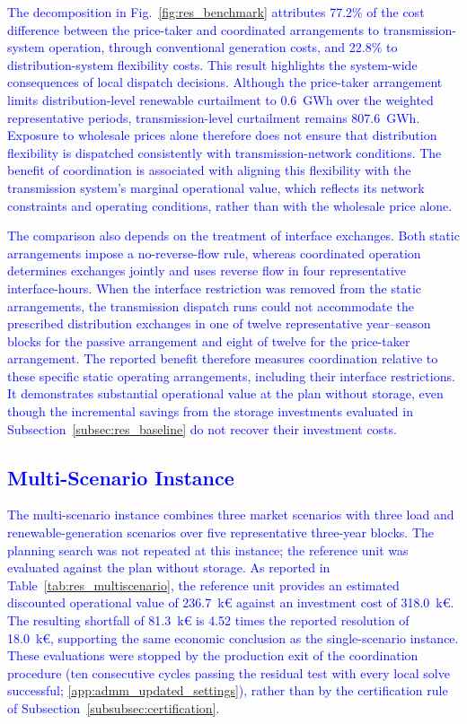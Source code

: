\documentclass[preprint,12pt]{elsarticle}
\begin{document}
\textcolor{blue}{
    The decomposition in Fig.~\ref{fig:res_benchmark} attributes 77.2\% of the cost difference between the price-taker and coordinated arrangements to transmission-system operation, through conventional generation costs, and 22.8\% to distribution-system flexibility costs. This result highlights the system-wide consequences of local dispatch decisions. Although the price-taker arrangement limits distribution-level renewable curtailment to 0.6~GWh over the weighted representative periods, transmission-level curtailment remains 807.6~GWh. Exposure to wholesale prices alone therefore does not ensure that distribution flexibility is dispatched consistently with transmission-network conditions. The benefit of coordination is associated with aligning this flexibility with the transmission system's marginal operational value, which reflects its network constraints and operating conditions, rather than with the wholesale price alone.
}

\textcolor{blue}{
    The comparison also depends on the treatment of interface exchanges. Both static arrangements impose a no-reverse-flow rule, whereas coordinated operation determines exchanges jointly and uses reverse flow in four representative interface-hours. When the interface restriction was removed from the static arrangements, the transmission dispatch runs could not accommodate the prescribed distribution exchanges in one of twelve representative year--season blocks for the passive arrangement and eight of twelve for the price-taker arrangement. The reported benefit therefore measures coordination relative to these specific static operating arrangements, including their interface restrictions. It demonstrates substantial operational value at the plan without storage, even though the incremental savings from the storage investments evaluated in Subsection~\ref{subsec:res_baseline} do not recover their investment costs.
}

\subsection{\textcolor{blue}{Multi-Scenario Instance}}
\label{subsec:res_multiscenario}

\textcolor{blue}{
    The multi-scenario instance combines three market scenarios with three load and renewable-generation scenarios over five representative three-year blocks. 
    The planning search was not repeated at this instance; the reference unit was evaluated against the plan without storage.
    As reported in Table~\ref{tab:res_multiscenario}, the reference unit provides an estimated discounted operational value of 236.7~k\euro{} against an investment cost of 318.0~k\euro{}. The resulting shortfall of 81.3~k\euro{} is 4.52 times the reported resolution of 18.0~k\euro{}, supporting the same economic conclusion as the single-scenario instance. These evaluations were stopped by the production exit of the coordination procedure (ten consecutive cycles passing the residual test with every local solve successful; \ref{app:admm_updated_settings}), rather than by the certification rule of Subsection~\ref{subsubsec:certification}.
}
\end{document}
